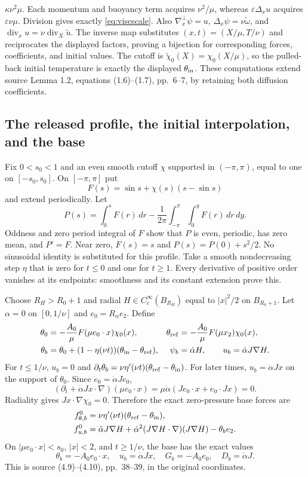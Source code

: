 $\kappa\nu^2\mu$. Each momentum and buoyancy term acquires
$\nu^2/\mu$, whereas $\varepsilon\Delta_xu$ acquires
$\varepsilon\nu\mu$. Division gives exactly \eqref{eq:viscscale}.
Also $\nabla_x^\perp\psi=u$, $\Delta_x\psi=\nu\widetilde\omega$,
and $\operatorname{div}_xu=\nu\operatorname{div}_X\widetilde u$.
The inverse map substitutes $(x,t)=(X/\mu,T/\nu)$ and reciprocates
the displayed factors, proving a bijection for corresponding forces,
coefficients, and initial values. The cutoff is
$\widetilde\chi_0(X)=\chi_0(X/\mu)$, so the pulled-back initial
temperature is exactly the displayed $\theta_{\rm in}$.
These computations extend source Lemma 1.2, equations (1.6)--(1.7),
pp.~6--7, by retaining both diffusion coefficients.

\subsection{The released profile, the initial interpolation, and the base}
Fix $0<s_0<1$ and an even smooth cutoff $\chi$ supported in
$(-\pi,\pi)$, equal to one on $[-s_0,s_0]$. On $[-\pi,\pi]$ put
\[
 F(s)=\sin s+\chi(s)(s-\sin s)
\]
and extend periodically. Let
\[
 P(s)=\int_0^sF(r)\,dr-
 \frac1{2\pi}\int_{-\pi}^{\pi}\int_0^yF(r)\,dr\,dy.
\]
Oddness and zero period integral of $F$ show that $P$ is even,
periodic, has zero mean, and $P'=F$. Near zero, $F(s)=s$ and
$P(s)=P(0)+s^2/2$. No sinusoidal identity is substituted for this profile.
Take a smooth nondecreasing step $\eta$ that is zero for $t\leq0$
and one for $t\geq1$. Every derivative of positive order vanishes
at its endpoints: smoothness and its constant extension prove this.

Choose $R_H>R_0+1$ and radial $H\in C_c^\infty(B_{R_H})$ equal to
$|x|^2/2$ on $B_{R_0+1}$. Let $\alpha=0$ on $[0,1/\nu]$ and
$e_0=R_\alpha e_2$. Define
\begin{align}
 \theta_0&=-\frac{A_0}{\mu}F(\mu e_0\cdot x)\chi_0(x),&
 \theta_{\rm ref}&=-\frac{A_0}{\mu}F(\mu x_2)\chi_0(x),\notag\\
 \theta_b&=\theta_0+(1-\eta(\nu t))
          (\theta_{\rm in}-\theta_{\rm ref}),&
 \psi_b&=\dot\alpha H,\qquad u_b=\dot\alpha J\nabla H.
 \label{eq:basephysical}
\end{align}
For $t\leq1/\nu$, $u_b=0$ and
$\partial_t\theta_b=\nu\eta'(\nu t)(\theta_{\rm ref}-\theta_{\rm in})$.
For later times, $u_b=\dot\alpha Jx$ on the support of $\theta_0$.
Since $\dot e_0=\dot\alpha Je_0$,
\[
 (\partial_t+\dot\alpha Jx\cdot\nabla)(\mu e_0\cdot x)
 =\mu\dot\alpha(Je_0\cdot x+e_0\cdot Jx)=0.
\]
Radiality gives $Jx\cdot\nabla\chi_0=0$. Therefore the exact
zero-pressure base forces are
\begin{align}
 f^0_{\theta,b}&=\nu\eta'(\nu t)(\theta_{\rm ref}-\theta_{\rm in}),\notag\\
 f^0_{u,b}&=\ddot\alpha J\nabla H+
 \dot\alpha^2(J\nabla H\cdot\nabla)(J\nabla H)-\theta_b e_2.
 \label{eq:baseforces}
\end{align}
On $|\mu e_0\cdot x|<s_0$, $|x|<2$, and $t\geq1/\nu$, the
base has the exact values
\[
 \theta_b=-A_0e_0\cdot x,\quad u_b=\dot\alpha Jx,
 \quad G_b=-A_0e_0,\quad D_b=\dot\alpha J.
\]
This is source (4.9)--(4.10), pp.~38--39, in the original coordinates.

